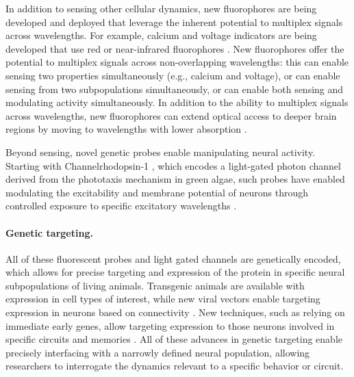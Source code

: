 In addition to sensing other cellular dynamics, new fluorophores  
are being developed and deployed that leverage the inherent 
potential to multiplex signals across wavelengths. For example,
calcium and voltage indicators are being developed that use 
red or near-infrared fluorophores 
\cite{Tischbirek:2015fi,Dana:2016hx}. New fluorophores offer 
the potential to multiplex signals across non-overlapping 
wavelengths: this can enable sensing two properties 
simultaneously (e.g., calcium and voltage), or can enable sensing
from two subpopulations simultaneously, or can enable both 
sensing and modulating activity simultaneously. In addition to 
the ability to multiplex signals across wavelengths, new 
fluorophores can extend optical access to deeper brain regions by 
moving to wavelengths with lower absorption 
\cite{Tischbirek:2015fi,Dana:2016hx}.

Beyond sensing, novel genetic probes enable manipulating 
neural activity. Starting with Channelrhodopsin-1 
\cite{Nagel:2002cw}, which encodes a light-gated photon 
channel derived from the phototaxis mechanism in green 
algae, such probes have enabled modulating the excitability 
and membrane potential of neurons through controlled 
exposure to specific excitatory wavelengths 
\cite{Boyden:2005cd,Deisseroth:2006dd,Yizhar:2011jv}.

\paragraph{Genetic targeting.} All of these fluorescent probes 
and light gated channels are genetically encoded, which 
allows for precise targeting and expression of the protein 
in specific neural subpopulations of living animals. 
Transgenic animals are available with expression in cell
types of interest, while new viral vectors enable targeting 
expression in neurons based on connectivity \cite{Tervo:2016go}.
New techniques, such as relying on immediate early genes, 
allow targeting expression to those neurons involved 
in specific circuits and memories \cite{Liu:2012jv}. All 
of these advances in genetic targeting enable precisely
interfacing with a narrowly defined neural population, 
allowing researchers to interrogate the dynamics relevant 
to a specific behavior or circuit.

